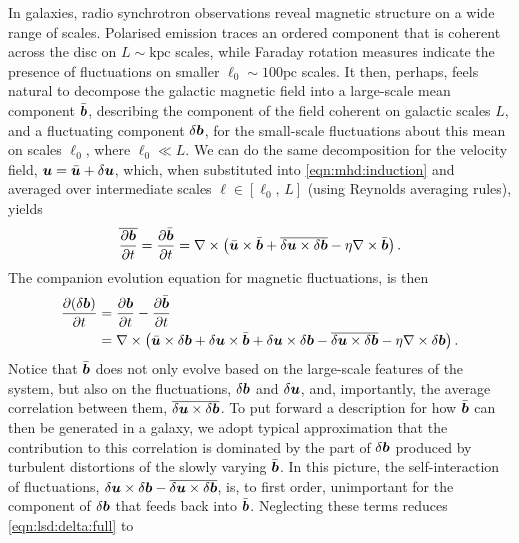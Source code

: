 In galaxies, radio synchrotron observations reveal magnetic structure on a wide range of scales. Polarised emission traces an ordered component that is coherent across the disc on $L \sim \mathrm{kpc}$ scales, while Faraday rotation measures indicate the presence of fluctuations on smaller $\ell_0 \sim 100 \mathrm{pc}$ scales. It then, perhaps, feels natural to decompose the galactic magnetic field into a large-scale mean component $\bar{\bm{b}}$, describing the component of the field coherent on galactic scales $L$, and a fluctuating component $\delta\bm{b}$, for the small-scale fluctuations about this mean on scales $\ell_0$, where $\ell_0 \ll L$. We can do the same decomposition for the velocity field, $\bm{u} = \bar{\bm{u}} + \delta\bm{u}$, which, when substituted into \autoref{eqn:mhd:induction} and averaged over intermediate scales $\ell \in [\ell_0, \,L]$ (using Reynolds averaging rules), yields
\begin{align}
    \overline{\frac{\partial \bm{b}}{\partial t}}
        =  \frac{\partial \bar{\bm{b}}}{\partial t}
        = \nabla \times \left( 
            \bar{\bm{u}} \times \bar{\bm{b}}
            + \overline{\delta\bm{u} \times \delta\bm{b}}
            - \eta \nabla \times \bar{\bm{b}}
         \right)
        . \label{eqn:lsd:average}
\end{align}
The companion evolution equation for magnetic fluctuations, is then
\begin{align}
    \frac{\partial (\delta\bm{b})}{\partial t}
        &= \frac{\partial \bm{b}}{\partial t} - \frac{\partial \bar{\bm{b}}}{\partial t} \\
        &= \nabla \times \left( 
            \bar{\bm{u}}\times\delta\bm{b}
            + \delta\bm{u}\times\bar{\bm{b}}
            + \delta\bm{u}\times\delta\bm{b}
            - \overline{\delta\bm{u}\times\delta\bm{b}}
            - \eta \nabla \times \delta\bm{b}
         \right)
    . \label{eqn:lsd:delta:full}
\end{align}
Notice that $\bar{\bm{b}}$ does not only evolve based on the large-scale features of the system, but also on the fluctuations, $\delta\bm{b}$ and $\delta\bm{u}$, and, importantly, the average correlation between them, $\overline{\delta\bm{u}\times\delta\bm{b}}$. To put forward a description for how $\bar{\bm{b}}$ can then be generated in a galaxy, we adopt typical approximation that the contribution to this correlation is dominated by the part of $\delta\bm{b}$ produced by turbulent distortions of the slowly varying $\bar{\bm{b}}$. In this picture, the self-interaction of fluctuations, $ \delta\bm{u}\times\delta\bm{b} - \overline{\delta\bm{u}\times\delta\bm{b}} $, is, to first order, unimportant for the component of $\delta\bm{b}$ that feeds back into $\bar{\bm{b}}$. Neglecting these terms reduces \autoref{eqn:lsd:delta:full} to
